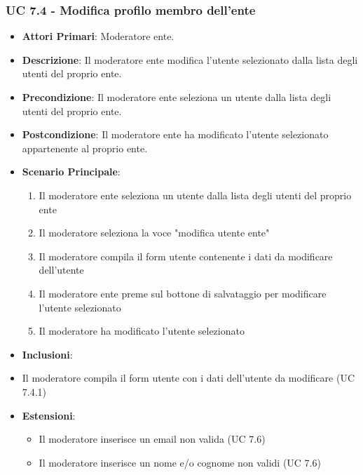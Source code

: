 			
			\subsubsection{UC 7.4 - Modifica profilo membro dell'ente}
			\begin{itemize}
				\item \textbf{Attori Primari}: Moderatore ente.
				\item \textbf{Descrizione}: Il moderatore ente modifica l'utente selezionato dalla lista degli utenti del proprio ente.
				\item \textbf{Precondizione}: Il moderatore ente seleziona un utente dalla lista degli utenti del proprio ente.
				\item \textbf{Postcondizione}: Il moderatore ente ha modificato l'utente selezionato appartenente al proprio ente.
				\item \textbf{Scenario Principale}:
				\begin{enumerate}
					\item{Il moderatore ente seleziona un utente dalla lista degli utenti del proprio ente}
					\item{Il moderatore seleziona la voce "modifica utente ente"}
					\item{Il moderatore compila il form utente contenente i dati da modificare dell'utente}
					\item{Il moderatore ente preme sul bottone di salvataggio per modificare l'utente selezionato}
					\item{Il moderatore ha modificato l'utente selezionato}
				\end{enumerate}	
				\item \textbf{Inclusioni}:
					\item Il moderatore compila il form utente con i dati dell'utente da modificare (UC 7.4.1)
				\item \textbf{Estensioni}:
				\begin{itemize}
					\item Il moderatore inserisce un email non valida (UC 7.6)
					\item Il moderatore inserisce un nome e/o cognome non validi (UC 7.6)
				\end{itemize}
			\end{itemize}

